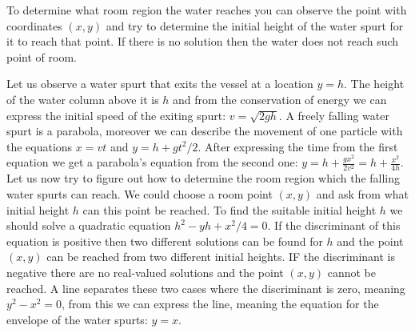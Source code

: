 \hinteng
To determine what room region the water reaches you can observe the point with coordinates $(x, y)$ and try to determine the initial height of the water spurt for it to reach that point. If there is no solution then the water does not reach such point of room.

\solueng
Let us observe a water spurt that exits the vessel at a location $y=h$. The height of the water column above it is $h$ and from the conservation of energy we can express the initial speed of the exiting spurt: $v=\sqrt{2gh}$. A freely falling water spurt is a parabola, moreover we can describe the movement of one particle with the equations $x=vt$ and $y=h+gt^2/2$. After expressing the time from the first equation we get a parabola’s equation from the second one: $y = h + \frac{gx^2}{2v^2} = h + \frac{x^2}{4h}$. Let us now try to figure out how to determine the room region which the falling water spurts can reach. We could choose a room point $(x,y)$ and ask from what initial height $h$ can this point be reached. To find the suitable initial height $h$ we should solve a quadratic equation $h^2 - yh + x^2/4 = 0$. If the discriminant of this equation is positive then two different solutions can be found for $h$ and the point $(x,y)$ can be reached from two different initial heights. IF the discriminant is negative there are no real-valued solutions and the point $(x,y)$ cannot be reached. A line separates these two cases where the discriminant is zero, meaning $y^2 - x^2=0$, from this we can express the line, meaning the equation for the envelope of the water spurts: $y=x$.
\probend